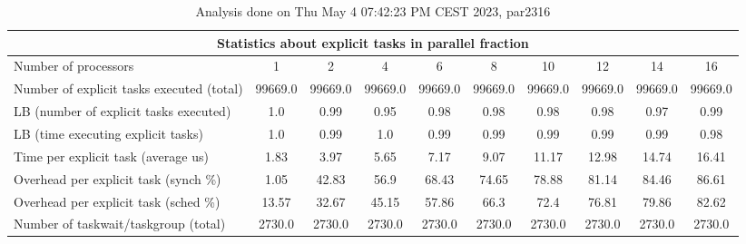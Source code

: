 \begin{table}[h]
\begin{center}
\begin{tabular}{|l|c|c|c|c|c|c|c|c|c|}
\hline
\multicolumn{10}{|c|}{Statistics about explicit tasks in parallel fraction} \\
\hline
\hline
Number of processors & 1 & 2 & 4 & 6 & 8 & 10 & 12 & 14 & 16 \\
\hline
\hline
Number of explicit tasks executed (total)        &         99669.0 &         99669.0 &         99669.0 &         99669.0 &         99669.0 &         99669.0 &         99669.0 &         99669.0 &         99669.0 \\
\hline
LB (number of explicit tasks executed)           &             1.0 &            0.99 &            0.95 &            0.98 &            0.98 &            0.98 &            0.98 &            0.97 &            0.99 \\
\hline
LB (time executing explicit tasks)               &             1.0 &            0.99 &             1.0 &            0.99 &            0.99 &            0.99 &            0.99 &            0.99 &            0.98 \\
\hline
Time per explicit task (average us)                 &            1.83 &            3.97 &            5.65 &            7.17 &            9.07 &           11.17 &           12.98 &           14.74 &           16.41 \\
\hline
Overhead per explicit task (synch \%)             &            1.05 &           42.83 &            56.9 &           68.43 &           74.65 &           78.88 &           81.14 &           84.46 &           86.61 \\
\hline
Overhead per explicit task (sched \%)             &           13.57 &           32.67 &           45.15 &           57.86 &            66.3 &            72.4 &           76.81 &           79.86 &           82.62 \\
\hline
Number of taskwait/taskgroup (total)             &          2730.0 &          2730.0 &          2730.0 &          2730.0 &          2730.0 &          2730.0 &          2730.0 &          2730.0 &          2730.0 \\
\hline
\end{tabular}
\end{center}
\caption{ Analysis done on Thu May  4 07:42:23 PM CEST 2023, par2316}
\end{table}
